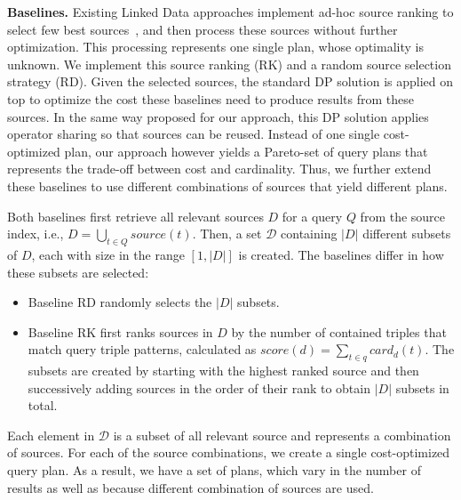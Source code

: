 \textbf{Baselines.} Existing Linked Data approaches implement ad-hoc
source ranking to select few best
sources~\cite{harth_data_2010,ladwig_linked_2010}, and then process
these sources without further optimization. This processing represents
one single plan, whose optimality is unknown. We implement this source
ranking (RK) and a random source selection strategy (RD). Given the
selected sources, the standard DP solution is applied on top to
optimize the cost these baselines need to produce results from these
sources. In the same way proposed for our approach, this DP solution
applies operator sharing so that sources can be reused. Instead of one
single cost-optimized plan, our approach however yields a Pareto-set
of query plans that represents the trade-off between cost and
cardinality. Thus, we further extend these baselines to use different
combinations of sources that yield different plans.

Both baselines first retrieve all relevant sources $D$ for a query $Q$
from the source index, i.e., $D = \bigcup_{t \in Q} source(t)$. Then,
a set $\mathcal{D}$ containing $|D|$ different subsets of $D$, each
with size in the range $[1,|D|]$ is created.
The baselines differ in how these
subsets are selected:
\begin{itemize}
\item Baseline RD randomly selects the $|D|$ subsets.
\item Baseline RK first ranks sources in $D$ by the number of
  contained triples that match query triple patterns, calculated as
  $score(d) = \sum_{t \in q} card_d(t)$. The subsets are created
  by starting with the highest ranked source and then successively
  adding sources in the order of their rank to obtain $|D|$ subsets in
  total.
\end{itemize}
Each element in $\mathcal{D}$ is a subset of all relevant source and
represents a combination of sources. For each of the source
combinations, we create a single cost-optimized query plan. As a
result, we have a set of plans, which vary in the number of results as
well as because different combination of sources are used.

